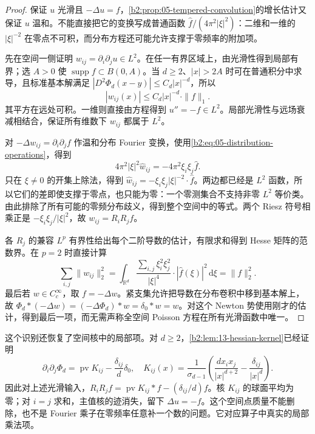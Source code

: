 \begin{proof}
保证 \(u\) 光滑且 \(-\Delta u=f\)，\cref{b2:prop:05-tempered-convolution}的增长估计又保证 \(u\) 温和。不能直接把它的变换写成普通函数 \(\widehat f/(4\pi^2|\xi|^2)\)：二维和一维的 \(|\xi|^{-2}\) 在零点不可积，而分布方程还可能允许支撑于零频率的附加项。

先在空间一侧证明 \(w_{ij}=\partial_i\partial_ju\in L^2\)。在任一有界区域上，由光滑性得到局部有界；选 \(A>0\) 使 \(\operatorname{supp}f\subset B(0,A)\)。当 \(d\geq2\)、\(|x|>2A\) 时可在普通积分中求导，且标准基本解满足 \(|D^2\Phi_d(x-y)|\leq C_d|x|^{-d}\)，所以
\[
 |w_{ij}(x)|\leq C_d|x|^{-d}\cdot\|f\|_1.
\]
其平方在远处可积。一维则直接由方程得到 \(u''=-f\in L^2\)。局部光滑性与远场衰减相结合，保证所有维数下 \(w_{ij}\) 都属于 \(L^2\)。

对 \(-\Delta w_{ij}=\partial_i\partial_jf\) 作温和分布 Fourier 变换，使用\eqref{b2:eq:05-distribution-operations}，得到
\[
 4\pi^2|\xi|^2\widehat w_{ij}
 =-4\pi^2\xi_i\xi_j\widehat f.
\]
只在 \(\xi\ne0\) 的开集上除法，得到
\(\widehat w_{ij}=-\xi_i\xi_j|\xi|^{-2}\cdot\widehat f\)。两边都已经是 \(L^2\) 函数，所以它们的差即使支撑于零点，也只能为零：一个零测集合不支持非零 \(L^2\) 等价类。由此排除了所有可能的零频分布歧义，得到整个空间中的等式。两个 Riesz 符号相乘正是 \(-\xi_i\xi_j/|\xi|^2\)，故 \(w_{ij}=R_iR_jf\)。

各 \(R_j\) 的兼容 \(L^p\) 有界性给出每个二阶导数的估计，有限求和得到 Hesse 矩阵的范数界。在 \(p=2\) 时直接计算
\[
 \sum_{i,j}\|w_{ij}\|_2^2
 =\int_{\mathbb R^d}
 \frac{\sum_{i,j}\xi_i^2\xi_j^2}{|\xi|^4}
 \cdot|\widehat f(\xi)|^2\,\mathrm d\xi
 =\|f\|_2^2.
\]
最后若 \(w\in C_c^\infty\)，取 \(f=-\Delta w\)。紧支集允许把导数在分布卷积中移到基本解上，故
\(\Phi_d*(-\Delta w)=(-\Delta\Phi_d)*w=\delta_0*w=w\)。对这个 Newton 势使用刚才的估计，得到最后一项，而无需声称全空间 Poisson 方程在所有光滑函数中唯一。
\end{proof}

这个识别还恢复了空间核中的局部项。对 \(d\geq2\)，\cref{b2:lem:13-hessian-kernel}已经证明
\[
 \partial_i\partial_j\Phi_d
 =\operatorname{pv}K_{ij}-\frac{\delta_{ij}}d\delta_0,
 \quad
 K_{ij}(x)=\frac1{\sigma_{d-1}}\left(
 \frac{d x_ix_j}{|x|^{d+2}}-\frac{\delta_{ij}}{|x|^d}\right).
\]
因此对上述光滑输入，\(R_iR_jf=\operatorname{pv}K_{ij}*f-(\delta_{ij}/d)f\)。核 \(K_{ij}\) 的球面平均为零；对 \(i=j\) 求和，主值核的迹消失，留下 \(\Delta u=-f\)。这个空间点质量不能删除，也不是 Fourier 乘子在零频率任意补一个数的问题。它对应算子中真实的局部乘法项。

